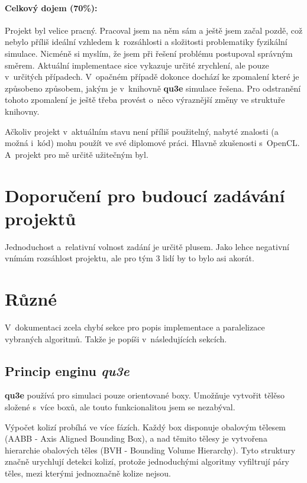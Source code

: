 \documentclass[11pt,a4paper]{article}
\begin{document}
\paragraph{Celkový dojem (70\%):}

Projekt byl velice pracný. Pracoval jsem na něm sám a ještě jsem začal pozdě,
což nebylo příliš ideální vzhledem k~rozsáhlosti a složitosti problematiky
fyzikální simulace. Nicméně si myslím, že jsem při řešení problému postupoval
správným směrem. Aktuální implementace sice vykazuje určité zrychlení, ale
pouze v~určitých případech. V~opačném případě dokonce dochází ke zpomalení
které je způsobeno způsobem, jakým je v~knihovně \textbf{qu3e} simulace řešena.
Pro odstranění tohoto zpomalení je ještě třeba provést o~něco výraznější změny
ve struktuře knihovny.

Ačkoliv projekt v~aktuálním stavu není příliš použitelný, nabyté znalosti
(a možná i~kód) mohu použít ve své diplomové práci. Hlavně zkušenosti s~OpenCL.
A~projekt pro mě určitě užitečným byl.

\section{Doporučení pro budoucí zadávání projektů}

Jednoduchost a~relativní volnost zadání je určitě plusem.
Jako lehce negativní vnímám rozsáhlost projektu, ale pro tým 3 lidí by to bylo
asi akorát.

\section{Různé}

V~dokumentaci zcela chybí sekce pro popis implementace a paralelizace vybraných
algoritmů. Takže je popíši v~následujících sekcích.

\subsection{Princip enginu \textit{qu3e}}

\textbf{qu3e} používá pro simulaci pouze orientované boxy. Umožňuje vytvořit
tělěso složené s~více boxů, ale touto funkcionalitou jsem se nezabýval.

Výpočet kolizí probíhá ve více fázích. Každý box disponuje obalovým tělesem
(AABB - Axis Aligned Bounding Box), a nad těmito tělesy je vytvořena hierarchie
obalových těles (BVH - Bounding Volume Hierarchy). Tyto struktury značně
urychlují detekci kolizí, protože jednoduchými algoritmy vyfiltrují páry
těles, mezi kterými jednoznačně kolize nejsou.
\end{document}
